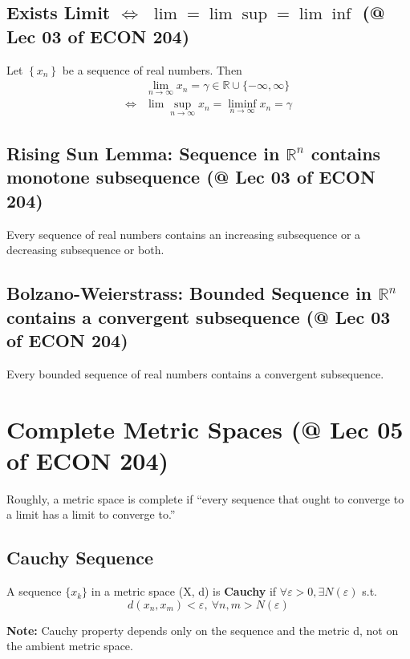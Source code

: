 \documentclass[11pt]{elegantbook}
\begin{document}
\subsection{Exists Limit $\Leftrightarrow$ $\lim=\lim\sup=\lim\inf$ \small{(@ Lec 03 of ECON 204)}}
\begin{theorem}
    Let $\left\{x_n\right\}$ be a sequence of real numbers. Then
    $$
    \begin{aligned}
    & \lim _{n \rightarrow \infty} x_n=\gamma \in \mathbb{R} \cup\{-\infty, \infty\} \\
    \Leftrightarrow & \lim \sup _{n \rightarrow \infty} x_n=\liminf _{n \rightarrow \infty} x_n=\gamma
    \end{aligned}
    $$
\end{theorem}

\subsection{Rising Sun Lemma: Sequence in $\mathbb{R}^n$ contains monotone subsequence \small{(@ Lec 03 of ECON 204)}}
\begin{theorem}
    Every sequence of real numbers contains an increasing subsequence or a decreasing subsequence or both.
\end{theorem}

\subsection{Bolzano-Weierstrass: Bounded Sequence in $\mathbb{R}^n$ contains a convergent subsequence \small{(@ Lec 03 of ECON 204)}}\label{B-W}
\begin{theorem}
    Every bounded sequence of real numbers contains a convergent subsequence.
\end{theorem}



\section{Complete Metric Spaces \small{(@ Lec 05 of ECON 204)}}
Roughly, a metric space is complete if “every sequence that ought to converge to a limit has a limit to converge to.”
\subsection{Cauchy Sequence}
\begin{definition}
    A sequence $\{x_k\}$ in a metric space (X, d) is \textbf{Cauchy} if $\forall \varepsilon>0, \exists N(\varepsilon)$ s.t.
    $$d(x_{n},x_{m})<\varepsilon,\  \forall n, m > N(\varepsilon)$$
\end{definition}
\textbf{Note:} Cauchy property depends only on the sequence and the metric d, not on the ambient metric space.
\end{document}
